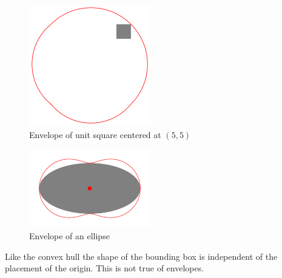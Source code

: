 \documentclass[11pt]{amsart}
\begin{document}
\begin{figure}[h]
 \centering
\includegraphics[width=150pt]{sq1_11.png}
\caption{Envelope of unit square centered at $(5,5)$}
\end{figure}

\begin{figure}[h]
 \centering
\includegraphics[width=150pt]{c1_00.png}
\caption{Envelope of an ellipse}
\end{figure}

Like the convex hull the shape of the bounding box is independent of the placement of the origin. This is not true of envelopes.
\end{document}
